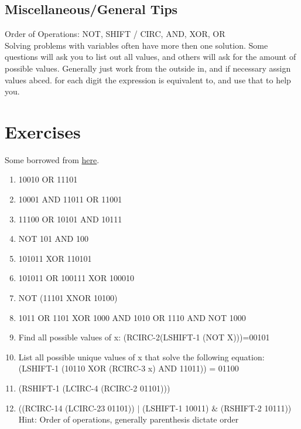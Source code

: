 \documentclass[11pt,letterpaper]{article}
\begin{document}
\subsection{Miscellaneous/General Tips}
Order of Operations: NOT, SHIFT / CIRC, AND, XOR, OR
\\
Solving problems with variables often have more then one solution. Some questions will ask you to list out all values, and others will ask for the amount of possible values. Generally just work from the outside in, and if necessary assign values abced. for each digit the expression is equivalent to, and use that to help you.
\section{Exercises}
Some borrowed from \href{http://minich.com/education/wyo/acsl/bitstringflicking/bitstringwksht1.htm}{here}.
\begin{enumerate}
\item 10010 OR 11101
\item 10001 AND 11011 OR 11001
\item 11100 OR 10101 AND 10111
\item NOT 101 AND 100
\item 101011 XOR 110101
\item 101011 OR 100111 XOR 100010
\item NOT (11101 XNOR 10100)
\item 1011 OR 1101 XOR 1000 AND 1010 OR 1110 AND NOT 1000
\item Find all possible values of x: (RCIRC-2(LSHIFT-1 (NOT X)))=00101
\item List all possible unique values of x that solve the following equation: \\
(LSHIFT-1 (10110 XOR (RCIRC-3 x) AND 11011)) = 01100
\item (RSHIFT-1 (LCIRC-4 (RCIRC-2 01101)))
\item ((RCIRC-14 (LCIRC-23 01101)) $\mid$ (LSHIFT-1 10011) $\&$ (RSHIFT-2 10111)) \\
Hint: Order of operations, generally parenthesis dictate order
\end{enumerate}
\end{document}
